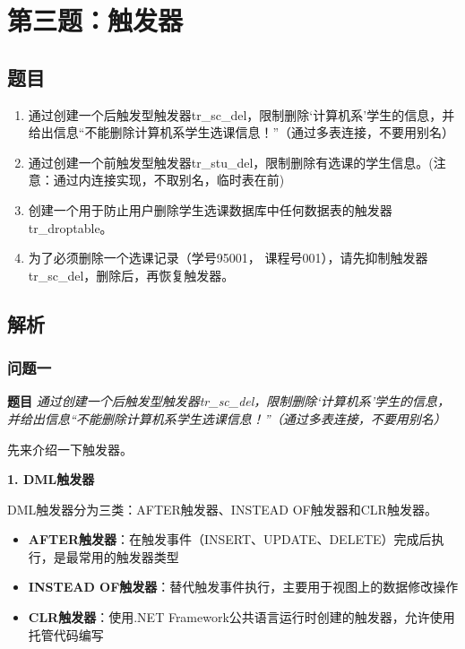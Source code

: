 \section{第三题：触发器}

\subsection{题目}

\begin{enumerate}
  \item 通过创建一个后触发型触发器tr\_sc\_del，限制删除‘计算机系’学生的信息，并给出信息“不能删除计算机系学生选课信息！”（通过多表连接，不要用别名）
  \item 通过创建一个前触发型触发器tr\_stu\_del，限制删除有选课的学生信息。(注意：通过内连接实现，不取别名，临时表在前)
  \item 创建一个用于防止用户删除学生选课数据库中任何数据表的触发器tr\_droptable。
  \item 为了必须删除一个选课记录（学号95001， 课程号001），请先抑制触发器tr\_sc\_del，删除后，再恢复触发器。
\end{enumerate}

\subsection{解析}

\subsubsection{问题一}

\textbf{题目} \emph{通过创建一个后触发型触发器tr\_sc\_del，限制删除‘计算机系’学生的信息，并给出信息“不能删除计算机系学生选课信息！”（通过多表连接，不要用别名）}

\vspace{6pt}

\qquad 先来介绍一下触发器。

\textbf{1. DML触发器}

\qquad DML触发器分为三类：AFTER触发器、INSTEAD OF触发器和CLR触发器。

\begin{itemize}
  \item \textbf{AFTER触发器}：在触发事件（INSERT、UPDATE、DELETE）完成后执行，是最常用的触发器类型
  \item \textbf{INSTEAD OF触发器}：替代触发事件执行，主要用于视图上的数据修改操作
  \item \textbf{CLR触发器}：使用.NET Framework公共语言运行时创建的触发器，允许使用托管代码编写
\end{itemize}

